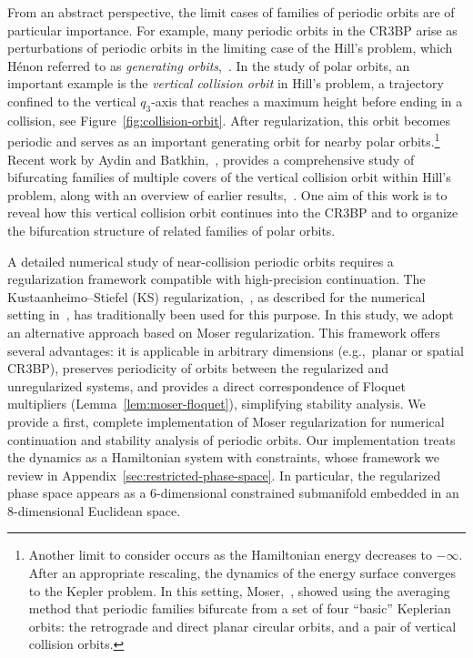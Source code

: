 \documentclass[pdflatex,sn-mathphys-ay]{sn-jnl}%
\theoremstyle{thmstyleone}%
\theoremstyle{thmstyletwo}%
\theoremstyle{thmstylethree}%
\begin{document}
From an abstract perspective, the limit cases of families of periodic orbits are of particular importance. 
For example, many periodic orbits in the CR3BP arise as perturbations of periodic orbits in the limiting case of the Hill's problem, which H\'enon referred to as \emph{generating orbits},~\cite{henon_generating_1997}.
In the study of polar orbits, an important example is the \emph{vertical collision orbit} in Hill's problem, a trajectory confined to the vertical $q_3$-axis that reaches a maximum height before ending in a collision, see Figure~\ref{fig:collision-orbit}. After regularization, this orbit becomes periodic and serves as an important generating orbit for nearby polar orbits.\footnote{Another limit to consider occurs as the Hamiltonian energy decreases to $-\infty$. After an appropriate rescaling, the dynamics of the energy surface converges to the Kepler problem. In this setting, Moser,~\cite{moser_regularization_1970}, showed using the averaging method that periodic families bifurcate from a set of four ``basic'' Keplerian orbits: the retrograde and direct planar circular orbits, and a pair of vertical collision orbits.} 
Recent work by Aydin and Batkhin,~\cite{aydin_Batkhin_hill_2025}, provides a comprehensive study of bifurcating families of multiple covers of the vertical collision orbit within Hill's problem, along with an overview of earlier results,~\cite{lidov_families_1983,batkhin_hierarchy_2009,belbruno_family_2019}.
One aim of this work is to reveal how this vertical collision orbit continues into the CR3BP and to organize the bifurcation structure of related families of polar orbits.

A detailed numerical study of near-collision periodic orbits requires a regularization framework compatible with high-precision continuation. The Kustaanheimo--Stiefel (KS) regularization,~\cite{Kustaanheimo_stiefel_regularization_1965}, as described for the numerical setting in~\cite{howell_breakwell_almost_rectilinear_halo_1984}, has traditionally been used for this purpose. In this study, we adopt an alternative approach based on Moser regularization. This framework offers several advantages: it is applicable in arbitrary dimensions (e.g.,~planar or spatial CR3BP), preserves periodicity of orbits between the regularized and unregularized systems, and provides a direct correspondence of Floquet multipliers (Lemma~\ref{lem:moser-floquet}), simplifying stability analysis. We provide a first, complete implementation of Moser regularization for numerical continuation and stability analysis of periodic orbits. Our implementation treats the dynamics as a Hamiltonian system with constraints, whose framework we review in Appendix~\ref{sec:restricted-phase-space}. In particular, the regularized phase space appears as a $6$-dimensional constrained submanifold embedded in an $8$-dimensional Euclidean space.
\end{document}

